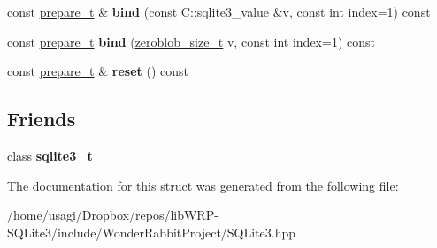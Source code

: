 \begin{DoxyCompactItemize}
\item 
\hypertarget{structWonderRabbitProject_1_1SQLite3_1_1prepare__t_af4c1b3d9d2874aad9021e601192908be}{const \hyperlink{structWonderRabbitProject_1_1SQLite3_1_1prepare__t}{prepare\-\_\-t} \& {\bfseries bind} (const C\-::sqlite3\-\_\-value \&v, const int index=1) const }\label{structWonderRabbitProject_1_1SQLite3_1_1prepare__t_af4c1b3d9d2874aad9021e601192908be}

\item 
\hypertarget{structWonderRabbitProject_1_1SQLite3_1_1prepare__t_a65ab7b53a3ccce82101ec2d9aa33081a}{const \hyperlink{structWonderRabbitProject_1_1SQLite3_1_1prepare__t}{prepare\-\_\-t} {\bfseries bind} (\hyperlink{structWonderRabbitProject_1_1SQLite3_1_1zeroblob__size__t}{zeroblob\-\_\-size\-\_\-t} v, const int index=1) const }\label{structWonderRabbitProject_1_1SQLite3_1_1prepare__t_a65ab7b53a3ccce82101ec2d9aa33081a}

\item 
\hypertarget{structWonderRabbitProject_1_1SQLite3_1_1prepare__t_aa10fcd31ffe13a4b5635807b8ae8f4ff}{const \hyperlink{structWonderRabbitProject_1_1SQLite3_1_1prepare__t}{prepare\-\_\-t} \& {\bfseries reset} () const }\label{structWonderRabbitProject_1_1SQLite3_1_1prepare__t_aa10fcd31ffe13a4b5635807b8ae8f4ff}

\end{DoxyCompactItemize}
\subsection*{Friends}
\begin{DoxyCompactItemize}
\item 
\hypertarget{structWonderRabbitProject_1_1SQLite3_1_1prepare__t_a2a10377939ab1f183ca75ceafc1eb686}{class {\bfseries sqlite3\-\_\-t}}\label{structWonderRabbitProject_1_1SQLite3_1_1prepare__t_a2a10377939ab1f183ca75ceafc1eb686}

\end{DoxyCompactItemize}


The documentation for this struct was generated from the following file\-:\begin{DoxyCompactItemize}
\item 
/home/usagi/\-Dropbox/repos/lib\-W\-R\-P-\/\-S\-Q\-Lite3/include/\-Wonder\-Rabbit\-Project/S\-Q\-Lite3.\-hpp\end{DoxyCompactItemize}
